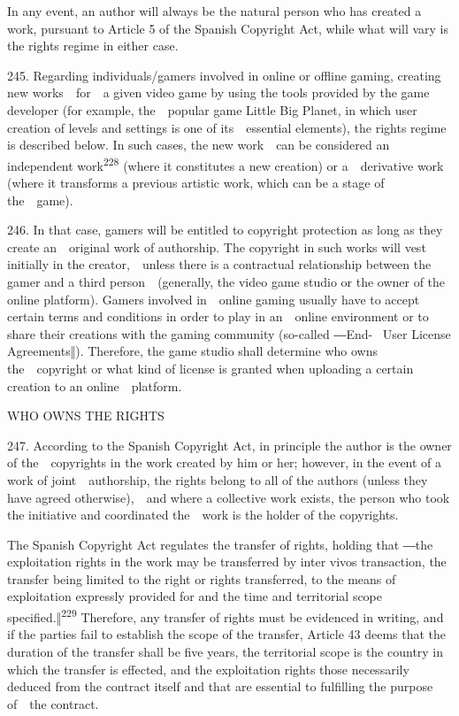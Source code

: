 \documentclass[
]{article}
\begin{document}
{In any event, an author will always be the natural person who has
created a work, pursuant to Article 5 of the Spanish }{Copyright Act}{,
while what will vary is the rights regime in either case.}

{245. }{Regarding individuals/gamers involved in online or offline
gaming, creating new works~~for~~a given video game by using the tools
provided by the game developer (for example, the~~popular game }{Little
Big Planet}{, in which user creation of levels and settings is one of
its~~essential elements), the rights regime is described below. In such
cases, the new work~~can be considered an independent
work}\textsuperscript{{228 }}{(where it constitutes a new creation) or
a~~derivative work (where it transforms a previous artistic work, which
can be a stage of the~~game).}

{246. }{In that case, gamers will be entitled to copyright protection as
long as they create an~~original work of authorship. The copyright in
such works will vest initially in the creator,~~unless there is a
contractual relationship between the gamer and a third
person~~(generally, the video game studio or the owner of the online
platform). Gamers involved in~~online gaming usually have to accept
certain terms and conditions in order to play in an~~online environment
or to share their creations with the gaming community (so-}{called
―End}{- }{~User License Agreements‖)}{. Therefore, the game studio shall
determine who owns the~~copyright or what kind of license is granted
when uploading a certain creation to an online~~platform.}

{WHO OWNS THE RIGHTS}

{247. }{According to the Spanish }{Copyright Act}{, in principle the
author is the owner of the~~copyrights in the work created by him or
her; however, in the event of a work of joint~~authorship, the rights
belong to all of the authors (unless they have agreed otherwise),~~and
where a collective work exists, the person who took the initiative and
coordinated the~~work is the holder of the copyrights.}

{The Spanish }{Copyright Act }{regulates the transfer of rights, holding
that }{―the exploitation }{rights in the work may be transferred by
}{inter vivos }{transaction, the transfer being limited to the right or
rights transferred, to the means of exploitation expressly provided for
and }{the time and territorial scope specified.‖}\textsuperscript{{229
}}{Therefore, any transfer of rights must be evidenced in writing, and
if the parties fail to establish the scope of the transfer, Article 43
deems that the duration of the transfer shall be five years, the
territorial scope is the country in which the transfer is effected, and
the exploitation rights those necessarily deduced from the contract
itself and that are essential to fulfilling the purpose of~~the
contract.}
\end{document}
